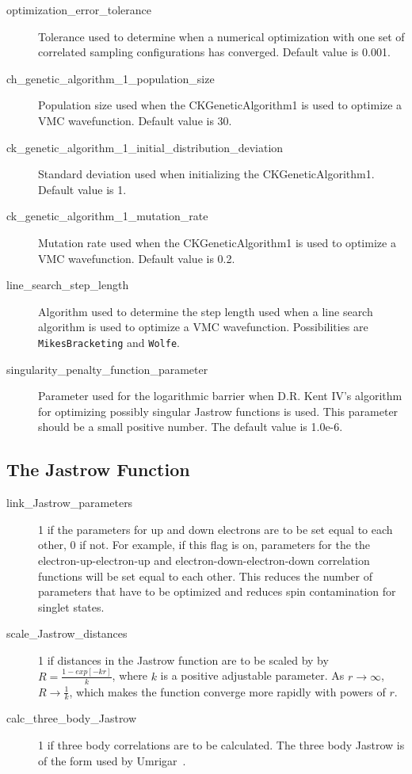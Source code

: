 \documentclass[11pt]{article}
\begin{document}
\begin{description}
\item [optimization\_error\_tolerance] Tolerance used to determine
  when a numerical optimization with one set of correlated sampling
  configurations has converged.  Default value is 0.001.

\item [ch\_genetic\_algorithm\_1\_population\_size] Population size
  used when the CKGeneticAlgorithm1 is used to optimize a VMC
  wavefunction.  Default value is 30.

\item [ck\_genetic\_algorithm\_1\_initial\_distribution\_deviation]
  Standard deviation used when initializing the CKGeneticAlgorithm1.
  Default value is 1.

\item [ck\_genetic\_algorithm\_1\_mutation\_rate] Mutation rate used
  when the CKGeneticAlgorithm1 is used to optimize a VMC
  wavefunction.  Default value is 0.2.  
 
\item [line\_search\_step\_length] Algorithm used to determine the
  step length used when a line search algorithm is used to optimize a
  VMC wavefunction.  Possibilities are \verb-MikesBracketing- and
  \verb-Wolfe-.

\item [singularity\_penalty\_function\_parameter] Parameter used
  for the logarithmic barrier when D.R. Kent IV's algorithm for
  optimizing possibly singular Jastrow functions is used.  This
  parameter should be a small positive number.  The default value is
  1.0e-6.

\end{description}

\subsection{The Jastrow Function}

\begin{description}

\item [link\_Jastrow\_parameters] 1 if the parameters for up and down
  electrons are to be set equal to each other, 0 if not.  For example,
  if this flag is on, parameters for the the electron-up-electron-up
  and electron-down-electron-down correlation functions will be set
  equal to each other.  This reduces the number of parameters that
  have to be optimized and reduces spin contamination for singlet
  states.  

\item [scale\_Jastrow\_distances] 1 if distances in the Jastrow function
  are to be scaled by by $R=\frac{1-exp[-kr]}{k}$, where $k$ is a
  positive adjustable parameter.  As $r \rightarrow \infty$, 
  $R \rightarrow \frac{1}{k}$, which makes the function converge more
  rapidly with powers of $r$. 

\item [calc\_three\_body\_Jastrow] 1 if three body correlations are to be
  calculated.  The three body Jastrow is of the form used by
  Umrigar~\cite{ThreeBodyJastrow}.

\end{description}
\end{document}
